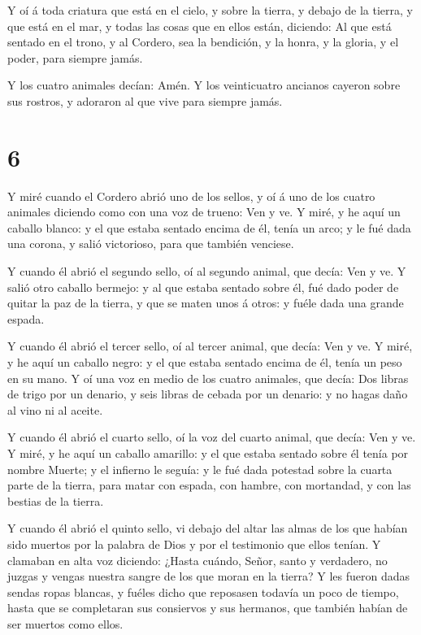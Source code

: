  Y oí á toda criatura que está en el cielo, y sobre la
tierra, y debajo de la tierra, y que está en el mar, y todas las cosas
que en ellos están, diciendo: Al que está sentado en el trono, y al
Cordero, sea la bendición, y la honra, y la gloria, y el poder, para
siempre jamás.

 Y los cuatro animales decían: Amén. Y los veinticuatro
ancianos cayeron sobre sus rostros, y adoraron al que vive para siempre
jamás.

\hypertarget{section-5}{%
\section{6}\label{section-5}}

 Y miré cuando el Cordero abrió uno de los sellos, y oí á
uno de los cuatro animales diciendo como con una voz de trueno: Ven y
ve.  Y miré, y he aquí un caballo blanco: y el que estaba
sentado encima de él, tenía un arco; y le fué dada una corona, y salió
victorioso, para que también venciese.

 Y cuando él abrió el segundo sello, oí al segundo animal,
que decía: Ven y ve.  Y salió otro caballo bermejo: y al que
estaba sentado sobre él, fué dado poder de quitar la paz de la tierra, y
que se maten unos á otros: y fuéle dada una grande espada.

 Y cuando él abrió el tercer sello, oí al tercer animal, que
decía: Ven y ve. Y miré, y he aquí un caballo negro: y el que estaba
sentado encima de él, tenía un peso en su mano.  Y oí una
voz en medio de los cuatro animales, que decía: Dos libras de trigo por
un denario, y seis libras de cebada por un denario: y no hagas daño al
vino ni al aceite.

 Y cuando él abrió el cuarto sello, oí la voz del cuarto
animal, que decía: Ven y ve.  Y miré, y he aquí un caballo
amarillo: y el que estaba sentado sobre él tenía por nombre Muerte; y el
infierno le seguía: y le fué dada potestad sobre la cuarta parte de la
tierra, para matar con espada, con hambre, con mortandad, y con las
bestias de la tierra.

 Y cuando él abrió el quinto sello, vi debajo del altar las
almas de los que habían sido muertos por la palabra de Dios y por el
testimonio que ellos tenían.  Y clamaban en alta voz
diciendo: ¿Hasta cuándo, Señor, santo y verdadero, no juzgas y vengas
nuestra sangre de los que moran en la tierra?  Y les fueron
dadas sendas ropas blancas, y fuéles dicho que reposasen todavía un poco
de tiempo, hasta que se completaran sus consiervos y sus hermanos, que
también habían de ser muertos como ellos.

